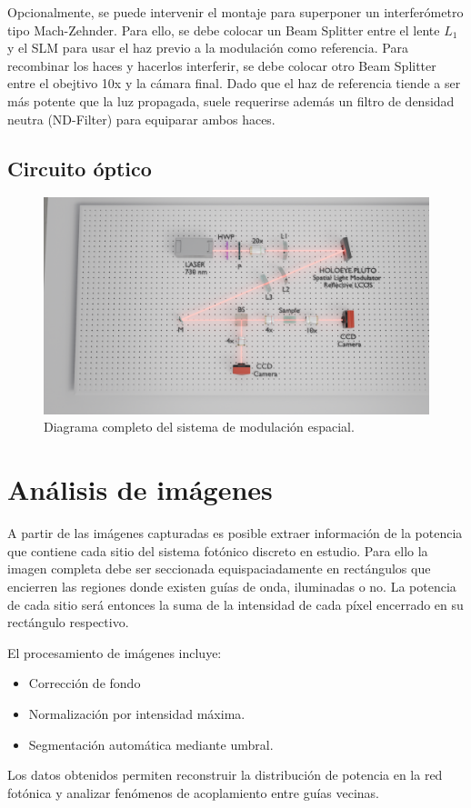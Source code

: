 Opcionalmente, se puede intervenir el montaje para superponer un interferómetro tipo Mach-Zehnder. Para ello, se debe colocar un Beam Splitter entre el lente $L_1$ y el SLM para usar el haz previo a la modulación como referencia. Para recombinar los haces y hacerlos interferir, se debe colocar otro Beam Splitter entre el obejtivo 10x y la cámara final. Dado que el haz de referencia tiende a ser más potente que la luz propagada, suele requerirse además un filtro de densidad neutra (ND-Filter) para equiparar ambos haces.

\subsection{Circuito óptico}
\begin{figure}[H]
    \centering
    \includegraphics[width=\linewidth, trim={21cm 5cm 7cm 5cm},clip]{media/SLM_setupv1}
    \caption{Diagrama completo del sistema de modulación espacial.}
\end{figure}

\section{Análisis de imágenes \label{sec:analimag}}
A partir de las imágenes capturadas es posible extraer información de la potencia que contiene cada sitio del sistema fotónico discreto en estudio. Para ello la imagen completa debe ser seccionada equispaciadamente en rectángulos que encierren las regiones donde existen guías de onda, iluminadas o no. La potencia de cada sitio será entonces la suma de la intensidad de cada píxel encerrado en su rectángulo respectivo.

El procesamiento de imágenes incluye:
\begin{itemize}
    \item Corrección de fondo
    \item Normalización por intensidad máxima.
    \item Segmentación automática mediante umbral.
\end{itemize}

Los datos obtenidos permiten reconstruir la distribución de potencia en la red fotónica y analizar fenómenos de acoplamiento entre guías vecinas.